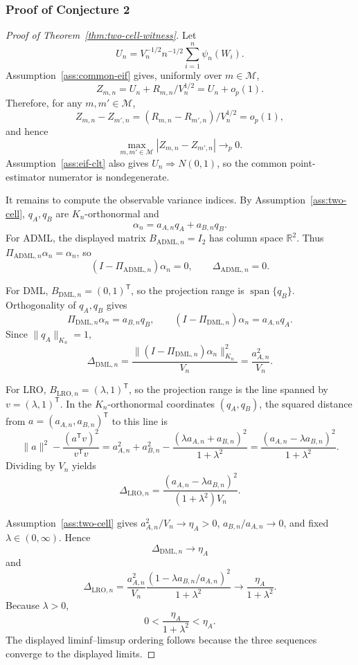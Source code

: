 \documentclass[11pt]{article}
\newcommand{\transpose}{\mathsf{T}}
\theoremstyle{definition}
\theoremstyle{plain}
\theoremstyle{remark}
\begin{document}
\subsubsection*{Proof of Conjecture 2}
\begin{proof}[Proof of Theorem~\ref{thm:two-cell-witness}]
Let
\[
  U_n=V_n^{-1/2}n^{-1/2}\sum_{i=1}^n\psi_n(W_i).
\]
Assumption~\ref{ass:common-eif} gives, uniformly over \(m\in\mathcal M\),
\[
  Z_{m,n}=U_n+R_{m,n}/V_n^{1/2}=U_n+o_p(1).
\]
Therefore, for any \(m,m'\in\mathcal M\),
\[
  Z_{m,n}-Z_{m',n}
  =(R_{m,n}-R_{m',n})/V_n^{1/2}
  =o_p(1),
\]
and hence
\[
  \max_{m,m'\in\mathcal M}|Z_{m,n}-Z_{m',n}|\to_p0.
\]
Assumption~\ref{ass:eif-clt} also gives \(U_n\Rightarrow N(0,1)\), so the common point-estimator numerator is nondegenerate.

It remains to compute the observable variance indices.  By Assumption~\ref{ass:two-cell}, \(q_A,q_B\) are \(K_n\)-orthonormal and
\[
  \alpha_n=a_{A,n}q_A+a_{B,n}q_B.
\]
For ADML, the displayed matrix \(B_{\mathrm{ADML},n}=I_2\) has column space \(\mathbb R^2\).  Thus \(\Pi_{\mathrm{ADML},n}\alpha_n=\alpha_n\), so
\[
  (I-\Pi_{\mathrm{ADML},n})\alpha_n=0,
  \qquad
  \Delta_{\mathrm{ADML},n}=0.
\]

For DML, \(B_{\mathrm{DML},n}=(0,1)^\transpose\), so the projection range is \(\operatorname{span}\{q_B\}\).  Orthogonality of \(q_A,q_B\) gives
\[
  \Pi_{\mathrm{DML},n}\alpha_n=a_{B,n}q_B,\qquad
  (I-\Pi_{\mathrm{DML},n})\alpha_n=a_{A,n}q_A.
\]
Since \(\|q_A\|_{K_n}=1\),
\[
  \Delta_{\mathrm{DML},n}
  =
  \frac{\|(I-\Pi_{\mathrm{DML},n})\alpha_n\|_{K_n}^2}{V_n}
  =
  \frac{a_{A,n}^2}{V_n}.
\]

For LRO, \(B_{\mathrm{LRO},n}=(\lambda,1)^\transpose\), so the projection range is the line spanned by \(v=(\lambda,1)^\transpose\).  In the \(K_n\)-orthonormal coordinates \((q_A,q_B)\), the squared distance from \(a=(a_{A,n},a_{B,n})^\transpose\) to this line is
\[
  \|a\|^2-\frac{(a^\transpose v)^2}{v^\transpose v}
  =
  a_{A,n}^2+a_{B,n}^2
  -
  \frac{(\lambda a_{A,n}+a_{B,n})^2}{1+\lambda^2}
  =
  \frac{(a_{A,n}-\lambda a_{B,n})^2}{1+\lambda^2}.
\]
Dividing by \(V_n\) yields
\[
  \Delta_{\mathrm{LRO},n}
  =
  \frac{(a_{A,n}-\lambda a_{B,n})^2}{(1+\lambda^2)V_n}.
\]

Assumption~\ref{ass:two-cell} gives \(a_{A,n}^2/V_n\to\eta_A>0\), \(a_{B,n}/a_{A,n}\to0\), and fixed \(\lambda\in(0,\infty)\).  Hence
\[
  \Delta_{\mathrm{DML},n}\to\eta_A
\]
and
\[
  \Delta_{\mathrm{LRO},n}
  =
  \frac{a_{A,n}^2}{V_n}
  \frac{(1-\lambda a_{B,n}/a_{A,n})^2}{1+\lambda^2}
  \to
  \frac{\eta_A}{1+\lambda^2}.
\]
Because \(\lambda>0\),
\[
  0<\frac{\eta_A}{1+\lambda^2}<\eta_A.
\]
The displayed liminf--limsup ordering follows because the three sequences converge to the displayed limits.


\end{proof}
\end{document}
